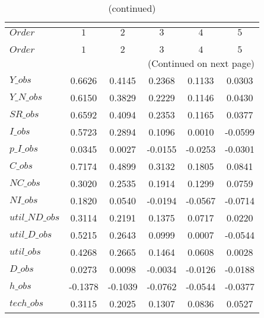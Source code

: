  
\begin{center}
\begin{longtable}{lccccc} 
\caption{COEFFICIENTS OF AUTOCORRELATION}\\
 \label{Table:th_autocorr_matrix}\\
\toprule 
$Order          $	 & 	 $          1$	 & 	 $          2$	 & 	 $          3$	 & 	 $          4$	 & 	 $          5$\\
\midrule \endfirsthead 
\caption{(continued)}\\
 \toprule \\ 
$Order          $	 & 	 $          1$	 & 	 $          2$	 & 	 $          3$	 & 	 $          4$	 & 	 $          5$\\
\midrule \endhead 
\midrule \multicolumn{6}{r}{(Continued on next page)} \\ \bottomrule \endfoot 
\bottomrule \endlastfoot 
$Y\_obs         $	 & 	     0.6626	 & 	     0.4145	 & 	     0.2368	 & 	     0.1133	 & 	     0.0303 \\ 
$Y\_N\_obs      $	 & 	     0.6150	 & 	     0.3829	 & 	     0.2229	 & 	     0.1146	 & 	     0.0430 \\ 
$SR\_obs        $	 & 	     0.6592	 & 	     0.4094	 & 	     0.2353	 & 	     0.1165	 & 	     0.0377 \\ 
$I\_obs         $	 & 	     0.5723	 & 	     0.2894	 & 	     0.1096	 & 	     0.0010	 & 	    -0.0599 \\ 
$p\_I\_obs      $	 & 	     0.0345	 & 	     0.0027	 & 	    -0.0155	 & 	    -0.0253	 & 	    -0.0301 \\ 
$C\_obs         $	 & 	     0.7174	 & 	     0.4899	 & 	     0.3132	 & 	     0.1805	 & 	     0.0841 \\ 
$NC\_obs        $	 & 	     0.3020	 & 	     0.2535	 & 	     0.1914	 & 	     0.1299	 & 	     0.0759 \\ 
$NI\_obs        $	 & 	     0.1820	 & 	     0.0540	 & 	    -0.0194	 & 	    -0.0567	 & 	    -0.0714 \\ 
$util\_ND\_obs  $	 & 	     0.3114	 & 	     0.2191	 & 	     0.1375	 & 	     0.0717	 & 	     0.0220 \\ 
$util\_D\_obs   $	 & 	     0.5215	 & 	     0.2643	 & 	     0.0999	 & 	     0.0007	 & 	    -0.0544 \\ 
$util\_obs      $	 & 	     0.4268	 & 	     0.2665	 & 	     0.1464	 & 	     0.0608	 & 	     0.0028 \\ 
$D\_obs         $	 & 	     0.0273	 & 	     0.0098	 & 	    -0.0034	 & 	    -0.0126	 & 	    -0.0188 \\ 
$h\_obs         $	 & 	    -0.1378	 & 	    -0.1039	 & 	    -0.0762	 & 	    -0.0544	 & 	    -0.0377 \\ 
$tech\_obs      $	 & 	     0.3115	 & 	     0.2025	 & 	     0.1307	 & 	     0.0836	 & 	     0.0527 \\ 
\end{longtable}
 \end{center}
